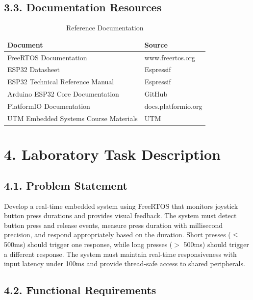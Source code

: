 \documentclass[12pt]{article}
\begin{document}
\subsection*{3.3. Documentation Resources}

\begin{table}[H]
	\centering
	\caption{Reference Documentation}
	\label{tab:documentation-resources}
	\begin{tabular}{|l|l|}
		\hline
		\textbf{Document} & \textbf{Source} \\
		\hline
		FreeRTOS Documentation & www.freertos.org \\
		\hline
		ESP32 Datasheet & Espressif \\
		\hline
		ESP32 Technical Reference Manual & Espressif \\
		\hline
		Arduino ESP32 Core Documentation & GitHub \\
		\hline
		PlatformIO Documentation & docs.platformio.org \\
		\hline
		UTM Embedded Systems Course Materials & UTM \\
		\hline
	\end{tabular}
\end{table}

\section*{4. Laboratory Task Description}

\subsection*{4.1. Problem Statement}

Develop a real-time embedded system using FreeRTOS that monitors joystick button press durations and provides visual feedback. The system must detect button press and release events, measure press duration with millisecond precision, and respond appropriately based on the duration. Short presses ($\leq$ 500ms) should trigger one response, while long presses ($>$ 500ms) should trigger a different response. The system must maintain real-time responsiveness with input latency under 100ms and provide thread-safe access to shared peripherals.

\subsection*{4.2. Functional Requirements}
\end{document}
